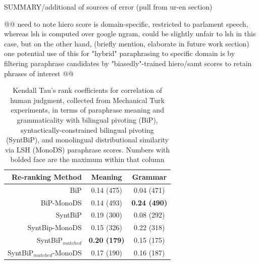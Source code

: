 \documentclass[11pt]{article}
\begin{document}
SUMMARY/additional of sources of error (pull from ur-en section)

@@ need to note hiero score is domain-specific, restricted to parlament speech, whereas lsh is computed over google ngram, could be slightly unfair to lsh in this case, but on the other hand, (briefly mention, elaborate in future work section) one potential use of this for "hybrid" paraphrasing to specific domain is by filtering paraphrase candidates by "biasedly"-trained hiero/samt scores to retain phrases of interest @@


\begin{table}%
\begin{center}
\begin{tabular}{rcc}%
\hline\hline \bf \footnotesize Re-ranking Method & \bf \footnotesize Meaning & \bf \footnotesize Grammar \\ \hline
{\scriptsize BiP} & {\scriptsize 0.14 (475)} & {\scriptsize 0.04 (471)} \\
{\scriptsize BiP-MonoDS} & {\scriptsize 0.14 (493)} & {\scriptsize \bf 0.24 (490)} \\
{\scriptsize SyntBiP} & {\scriptsize 0.19 (300)}& {\scriptsize 0.08 (292)} \\
{\scriptsize SyntBip-MonoDS} & {\scriptsize 0.15 (326)} & {\scriptsize 0.22 (318)} \\
\hline 
{\scriptsize SyntBiP$_{matched}$} &  {\scriptsize \bf 0.20 (179)} & {\scriptsize 0.15 (175)} \\
{\scriptsize SyntBiP$_{matched}$-MonoDS}&  {\scriptsize 0.17 (190)} & {\scriptsize 0.16 (187)} \\
\hline
\end{tabular}
\end{center}
\caption{\label{table4} Kendall Tau's rank coefficients for correlation of human judgment, collected from Mechanical Turk experiments, in terms of paraphrase meaning and grammaticality with bilingual pivoting (BiP), syntactically-constrained bilingual pivoting (SyntBiP), and monolingual distributional similarity via LSH (MonoDS) paraphrase scores. Numbers with bolded face are the maximum within that column}
\end{table}

\end{document}
